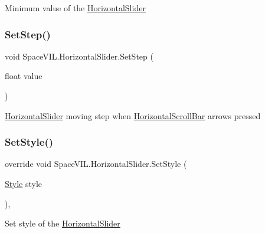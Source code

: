 Minimum value of the \mbox{\hyperlink{class_space_v_i_l_1_1_horizontal_slider}{Horizontal\+Slider}} 

\mbox{\label{class_space_v_i_l_1_1_horizontal_slider_a18ffac2f0c6f4f01725b4fd3778dc388}} 
\subsubsection{\texorpdfstring{Set\+Step()}{SetStep()}}
{\footnotesize\ttfamily void Space\+V\+I\+L.\+Horizontal\+Slider.\+Set\+Step (\begin{DoxyParamCaption}\item[{float}]{value }\end{DoxyParamCaption})\hspace{0.3cm}{\ttfamily [inline]}}



\mbox{\hyperlink{class_space_v_i_l_1_1_horizontal_slider}{Horizontal\+Slider}} moving step when \mbox{\hyperlink{class_space_v_i_l_1_1_horizontal_scroll_bar}{Horizontal\+Scroll\+Bar}} arrows pressed 

\mbox{\label{class_space_v_i_l_1_1_horizontal_slider_aa8a43a400a6fcab217d8af348071bc5f}} 
\subsubsection{\texorpdfstring{Set\+Style()}{SetStyle()}}
{\footnotesize\ttfamily override void Space\+V\+I\+L.\+Horizontal\+Slider.\+Set\+Style (\begin{DoxyParamCaption}\item[{\mbox{\hyperlink{class_space_v_i_l_1_1_decorations_1_1_style}{Style}}}]{style }\end{DoxyParamCaption})\hspace{0.3cm}{\ttfamily [inline]}, {\ttfamily [virtual]}}



Set style of the \mbox{\hyperlink{class_space_v_i_l_1_1_horizontal_slider}{Horizontal\+Slider}} 



